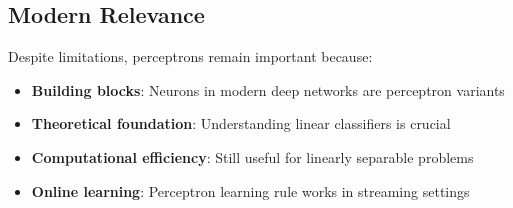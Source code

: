\subsection{Modern Relevance}
Despite limitations, perceptrons remain important because:
\begin{itemize}
    \item \textbf{Building blocks}: Neurons in modern deep networks are perceptron variants
    \item \textbf{Theoretical foundation}: Understanding linear classifiers is crucial
    \item \textbf{Computational efficiency}: Still useful for linearly separable problems
    \item \textbf{Online learning}: Perceptron learning rule works in streaming settings
\end{itemize}